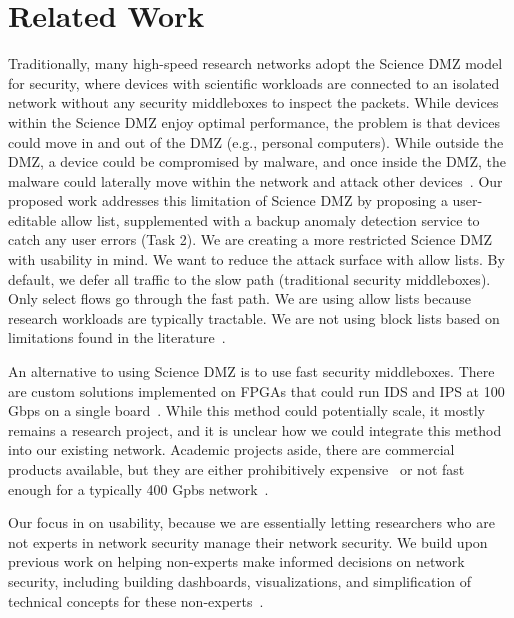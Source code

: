 \section{Related Work}

Traditionally, many high-speed research networks adopt the Science DMZ model~\cite{dart2013science} for security, where devices with scientific workloads are connected to an isolated network without any security middleboxes to inspect the packets. While devices within the Science DMZ enjoy optimal performance, the problem is that devices could move in and out of the DMZ (e.g., personal computers). While outside the DMZ, a device could be compromised by malware, and once inside the DMZ, the malware could laterally move within the network and attack other devices~\cite{ho2019detecting}. Our proposed work addresses this limitation of Science DMZ by proposing a user-editable allow list, supplemented with a backup anomaly detection service to catch any user errors (Task 2). We are creating a more restricted Science DMZ with usability in mind. We want to reduce the attack surface with allow lists. By default, we defer all traffic to the slow path (traditional security middleboxes). Only select flows go through the fast path. We are using allow lists because research workloads are typically tractable. We are not using block lists based on limitations found in the literature~\cite{235461}.

An alternative to using Science DMZ is to use fast security middleboxes. There are custom solutions implemented on FPGAs that could run IDS and IPS at 100 Gbps on a single board~\cite{zhao-osdi20}. While this method could potentially scale, it mostly remains a research project, and it is unclear how we could integrate this method into our existing network. Academic projects aside, there are commercial products available, but they are either prohibitively expensive~\cite{panswitch} or not fast enough for a typically 400 Gpbs network~\cite{ciscoswitch}.



Our focus in on usability, because we are essentially letting researchers who are not experts in network security manage their network security. We build upon previous work on helping non-experts make informed decisions on network security, including building dashboards, visualizations, and simplification of technical concepts for these non-experts~\cite{huang2020iot,thakkar2022would,cruz2023augmented,emami2020ask}.




